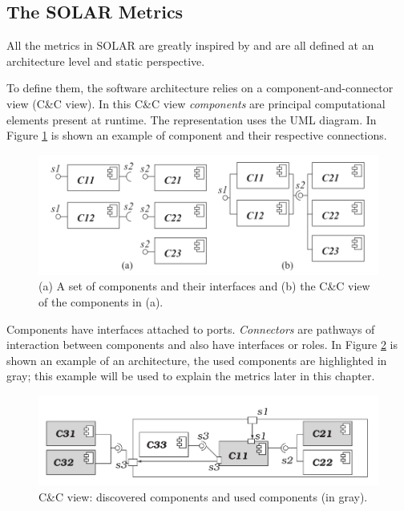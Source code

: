 \subsection{The SOLAR Metrics}
All the metrics in SOLAR are greatly inspired by \cite{po-metrics} and are all defined at an architecture level and static perspective. 

To define them, the software architecture relies on a component-and-connector view (C\&C view). In this C\&C view \emph{components} are principal computational elements present at runtime. The representation uses the UML diagram. In Figure \ref{fig:comp-example} is shown an example of component and their respective connections.

\begin{figure}[ht]
	\centerline
	{\includegraphics[scale=0.55]{img/solar-comp-example.png}}
	\caption[SOLAR Components example]{(a) A set of components and their interfaces and (b) the C\&C view of the components in (a).\cite{solar}}
	\label{fig:comp-example}
\end{figure}

Components have interfaces attached to ports. \emph{Connectors} are pathways of interaction between components and also have interfaces or roles. In Figure \ref{fig:solar-arch-example} is shown an example of an architecture, the used components are highlighted in gray; this example will be used to explain the metrics later in this chapter.

\begin{figure}[ht]
	\centerline
	{\includegraphics[scale=0.55]{img/solar-arch-example.png}}
	\caption[SOLAR example architecure]{C\&C view: discovered components and used components (in gray).\cite{solar}}
	\label{fig:solar-arch-example}
\end{figure}

